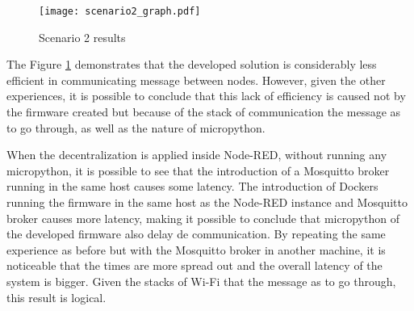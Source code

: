 \captionsetup{belowskip=12pt,aboveskip=4pt}
\begin{table}[ht]
    \centering
    \caption{Scenario 2 results}
    \label{tab:scenario2_table}
\end{table}{}

\begin{figure}[h]
\centering
\texttt{[image: scenario2\_graph.pdf]}
\caption[Scenario 2 results]{Scenario 2 results}\label{fig:scenario2_candlestick}
\end{figure}

The Figure \ref{fig:scenario2_candlestick} demonstrates that the developed solution is considerably less efficient in communicating message between nodes. However, given the other experiences, it is possible to conclude that this lack of efficiency is caused not by the firmware created but because of the stack of communication the message as to go through, as well as the nature of micropython. 

When the decentralization is applied inside Node-RED, without running any micropython, it is possible to see that the introduction of a Mosquitto broker running in the same host causes some latency. The introduction of Dockers running the firmware in the same host as the Node-RED instance and Mosquitto broker causes more latency, making it possible to conclude that micropython of the developed firmware also delay de communication. By repeating the same experience as before but with the Mosquitto broker in another machine, it is noticeable that the times are more spread out and the overall latency of the system is bigger. Given the stacks of Wi-Fi that the message as to go through, this result is logical.

